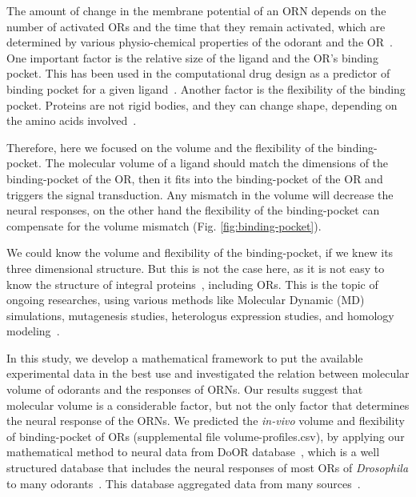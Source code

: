 \documentclass[11pt]{paper} %
\begin{document}

The amount of change in the membrane potential of an ORN depends on the number of activated ORs and the time that they remain activated,
which are determined by various physio-chemical properties of the odorant and the OR~\cite{Turin,Araneda2000,Gabler2013,guerrieri2005,uchida2000}.
One important factor is the relative size of the ligand and the OR's binding pocket. 
This has been used in the computational drug design as a predictor of binding pocket for a given ligand~\cite{liang1998anatomy}. 
Another factor is the flexibility of the binding pocket. 
Proteins are not rigid bodies,  
and they can change shape, 
depending on the amino acids involved~\cite{Ramachandran,apostolakis1998docking,gunasekaran2007different}.

Therefore, here we focused on the volume and the flexibility of the binding-pocket.
The molecular volume of a ligand should match the dimensions of the binding-pocket of the OR,
then it fits into the binding-pocket of the OR and triggers the signal transduction. 
Any mismatch in the volume will decrease the neural responses, 
on the other hand the flexibility of the binding-pocket can compensate for the volume mismatch (Fig. \ref{fig:binding-pocket}).

We could know the volume and flexibility of the binding-pocket, 
if we knew its three dimensional structure. 
But this is not the case here, 
as it is not easy to know the structure of integral proteins~\cite{Zhang2008,Lupieri2009}, 
including ORs. 
This is the topic of ongoing researches, 
using various methods like Molecular Dynamic (MD) simulations, 
mutagenesis studies, heterologus expression studies, and homology modeling~\cite{Khafizov2007,Man2004,Lai2005,Vaidehi2002,Floriano2004,Schmiedeberg2007,Katada2005,Kato2008,Rospars2013}.

In this study, 
we develop a mathematical framework to put the available experimental data in the best use and
investigated the relation between molecular volume of odorants and the responses of ORNs. 
Our results suggest that molecular volume is a considerable factor, 
but not the only factor that determines the neural response of the ORNs.
We predicted the {\it in-vivo} volume and flexibility of binding-pocket of ORs (supplemental file volume-profiles.csv), 
by applying our mathematical method to neural data from DoOR database~\cite{Galizia2010}, 
which is a well structured database that includes the neural responses of most ORs of \textit{Drosophila} to many odorants~\cite{Galizia2010}. 
This database aggregated data from many sources~\cite{Bruyne1999,Bruyne2001,Dobritsa2003,Goldman2005,Hallem2004,Hallem2006,
Kreher2005,Kreher2008,Kwon2007,Pelz2006,Pelz2006,Schmuker2007,Stensmyr2003,
Turner2009,VanderGoesvanNaters2007,Yao2005}.
\end{document}
